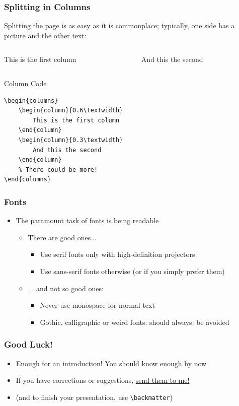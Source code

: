 \documentclass{beamer}
\newcommand{\hrefcol}[2]{\textcolor{cyan}{\href{#1}{#2}}}
\begin{document}
\begin{frame}[fragile]
\frametitle{Splitting in Columns}
Splitting the page is as easy as it is commonplace;
typically, one side has a picture and the other text:
\begin{columns}
\begin{column}{0.6\textwidth}
This is the first column
\end{column}
\begin{column}{0.3\textwidth}
And this the second
\end{column}
\end{columns}
\begin{block}{Column Code}
\begin{verbatim}
\begin{columns}
    \begin{column}{0.6\textwidth}
        This is the first column
    \end{column}
    \begin{column}{0.3\textwidth}
        And this the second
    \end{column}
    % There could be more!
\end{columns}
\end{verbatim}
\end{block}
\end{frame}

\begin{frame}[fragile]
\frametitle{Fonts}
\begin{itemize}
\item The paramount task of fonts is being readable
\begin{itemize}
\item There are good ones...
\begin{itemize}
\item {\rmfamily Use serif fonts only with high-definition projectors}
\item {\sffamily Use sans-serif fonts otherwise (or if you simply prefer them)}
\end{itemize}
\item ... and not so good ones:
\begin{itemize}
\item {\ttfamily Never use monospace for normal text}
\item {\frakfamily Gothic, calligraphic or weird fonts: should always: be
avoided}
\end{itemize}
\end{itemize}
\end{itemize}
\end{frame}

\begin{frame}[fragile]
\frametitle{Good Luck!}
\begin{itemize}
\item Enough for an introduction! You should know enough by now
\item If you have corrections or suggestions,
\hrefcol{mailto:federico.zenith@sintef.no}{send them to me!}
\item (and to finish your presentation, use \verb|\backmatter|)
\end{itemize}
\end{frame}

\backmatter
\end{document}
